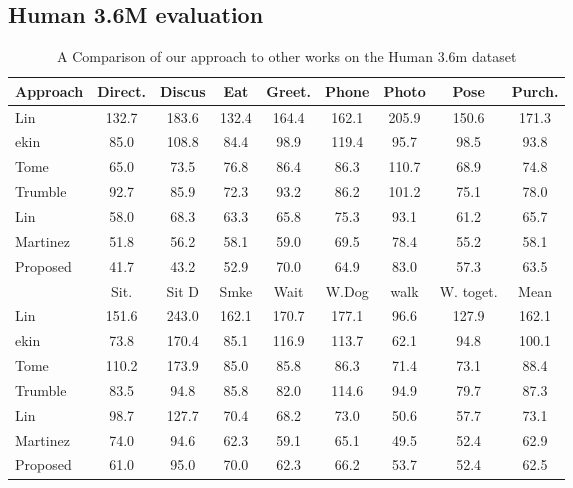 \documentclass[runningheads]{llncs}
\begin{document}
\subsection{Human 3.6M evaluation}
\begin{table}[htb]

\centering
{
\small
\begin{tabular}{lcccccccc}
\hline
Approach                              & Direct. & Discus & Eat & Greet. &Phone &Photo &Pose &Purch. \\ \hline
Lin~\cite{li2015maximumH36m}          & 132.7& 183.6 & 132.4& 164.4 &162.1&205.9&150.6 &171.3 \\
ekin~\cite{tekin2016fusingH36m}       & 85.0 & 108.8 & 84.4 & 98.9 &119.4&95.7 &98.5 &93.8 \\
Tome~\cite{tome2017liftingH36m}       &65.0 & 73.5 & 76.8 & 86.4 & 86.3&110.7&68.9 &74.8 \\ 
Trumble~\cite{trumble_total_2017}     & 92.7& 85.9& 72.3& 93.2& 86.2&101.2 &75.1 &78.0 \\ 
Lin~\cite{lin2017CVPRRPSM}              &58.0    & 68.3 & 63.3 &65.8  & 75.3 &93.1&61.2&65.7 \\ 
Martinez~\cite{martinez_simple_2017}          &51.8 & 56.2&58.1 & 59.0& 69.5&78.4  & 55.2 & 58.1 \\\hline


Proposed                              & 41.7& 43.2& 52.9& 70.0& 64.9& 83.0& 57.3& 63.5\\ \hline

& Sit. & Sit D & Smke & Wait &W.Dog& walk & W. toget. &Mean\\\hline
Lin~\cite{li2015maximumH36m} & 151.6 & 243.0 & 162.1 &170.7 &177.1& 96.6 & 127.9 & 162.1 \\
ekin~\cite{tekin2016fusingH36m} & 73.8 & 170.4 &85.1 &116.9 &113.7& 62.1 & 94.8 & 100.1 \\
Tome~\cite{tome2017liftingH36m} & 110.2 &173.9 &85.0 &85.8 &86.3 &71.4 &73.1 & 88.4 \\ 
Trumble~\cite{trumble_total_2017}  & 83.5& 94.8& 85.8&82.0 &114.6 &94.9 &79.7 &87.3 \\
Lin~\cite{lin2017CVPRRPSM}              &98.7 &127.7 &70.4 &68.2   & 73.0 & 50.6 & 57.7 & 73.1 \\ 
Martinez~\cite{martinez_simple_2017}      & 74.0 &94.6&62.3&59.1&65.1   &49.5 &52.4 &62.9 \\\hline
Proposed &61.0 &95.0 &70.0 &62.3 &66.2 &53.7 &52.4 &62.5 \\     \hline

\end{tabular}}
\caption{A Comparison of our approach to other works on the Human 3.6m dataset}
\squeezeup
\squeezeup
\label{tab:H36mResults}



\end{table}
\end{document}

